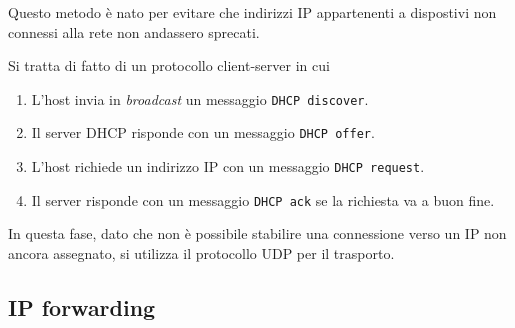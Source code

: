 Questo metodo è nato per evitare che indirizzi IP appartenenti a dispostivi non connessi alla rete
non andassero sprecati.

Si tratta di fatto di un protocollo client-server in cui
\begin{enumerate}
	\item L'host invia in \emph{broadcast} un messaggio \verb|DHCP discover|.
	\item Il server DHCP risponde con un messaggio \verb|DHCP offer|.
	\item L'host richiede un indirizzo IP con un messaggio \verb|DHCP request|.
	\item Il server risponde con un messaggio \verb|DHCP ack| se la richiesta va a buon fine.
\end{enumerate}
In questa fase, dato che non è possibile stabilire una connessione verso un IP non ancora 
assegnato, si utilizza il protocollo UDP per il trasporto.

\subsection{IP forwarding}

